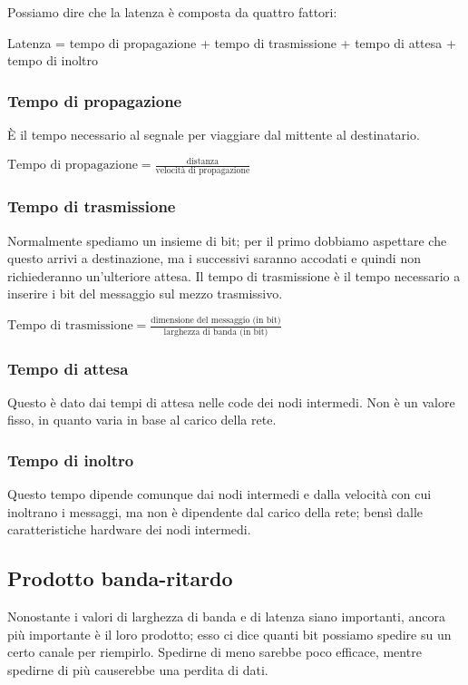         Possiamo dire che la latenza è composta da quattro fattori:
        \begin{center}
            Latenza = tempo di propagazione + tempo di trasmissione + tempo di attesa + tempo di inoltro
       \end{center}
       
       \subsubsection{Tempo di propagazione}
            È il tempo necessario al segnale per viaggiare dal mittente al destinatario.
            \begin{center}
                $\text{Tempo di propagazione} = \frac{\text{distanza}}{\text{velocità di propagazione}}$
            \end{center}
            
        \subsubsection{Tempo di trasmissione}
            Normalmente spediamo un insieme di bit; per il primo dobbiamo aspettare che questo arrivi a destinazione, ma i successivi saranno accodati e quindi non richiederanno un'ulteriore attesa. Il tempo di trasmissione è il tempo necessario a inserire i bit del messaggio sul mezzo trasmissivo.
            \begin{center}
                $\text{Tempo di trasmissione} = \frac{\text{dimensione del messaggio (in bit)}}{\text{larghezza di banda (in bit)}}$
            \end{center}
            
        \subsubsection{Tempo di attesa}
            Questo è dato dai tempi di attesa nelle code dei nodi intermedi. Non è un valore fisso, in quanto varia in base al carico della rete.
            
        \subsubsection{Tempo di inoltro}
            Questo tempo dipende comunque dai nodi intermedi e dalla velocità con cui inoltrano i messaggi, ma non è dipendente dal carico della rete; bensì dalle caratteristiche hardware dei nodi intermedi.
            
    \subsection{Prodotto banda-ritardo}
        Nonostante i valori di larghezza di banda e di latenza siano importanti, ancora più importante è il loro prodotto; esso ci dice quanti bit possiamo spedire su un certo canale per riempirlo. Spedirne di meno sarebbe poco efficace, mentre spedirne di più causerebbe una perdita di dati.